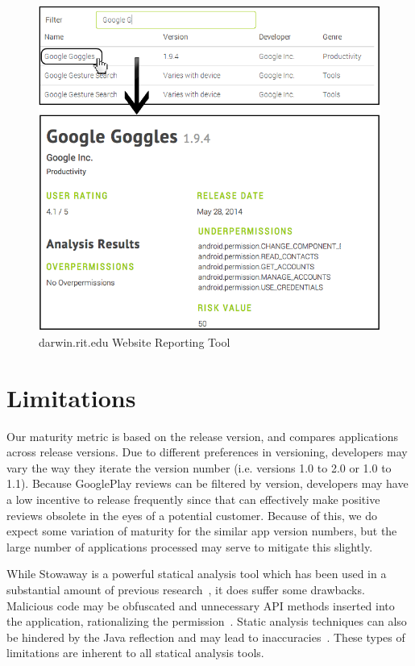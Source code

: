 \documentclass[conference]{IEEEtran}
\begin{document}
\begin{figure}[ht!]
\centering
\includegraphics[width=\columnwidth, angle = 0]{images/screenshot3.png}
\caption{darwin.rit.edu Website Reporting Tool}
\label{fig:website1}
\end{figure}

\section{Limitations}
\label{sec:limitations}

Our maturity metric is based on the release version, and compares applications across release versions. Due to different preferences in versioning, developers may vary the way they iterate the version number (i.e. versions 1.0 to 2.0 or 1.0 to 1.1). Because GooglePlay reviews can be filtered by version, developers may have a low incentive to release frequently since that can effectively make positive reviews obsolete in the eyes of a potential customer. Because of this, we do expect some variation of maturity for the similar app version numbers, but the large number of applications processed may serve to mitigate this slightly.

While Stowaway is a powerful statical analysis tool which has been used in a substantial amount of previous research~\cite{Pearce:2012:APS:2414456.2414498,Stevens_investigatinguser,jeon2011dr}, it does suffer some drawbacks. Malicious code may be obfuscated and unnecessary API methods inserted into the application, rationalizing the permission~\cite{6698893}. Static analysis techniques can also be hindered by the Java reflection and may lead to inaccuracies~\cite{Sridharan:2006:RCP:1133255.1134027,Tripp:2009:TET:1542476.1542486}. These types of limitations are inherent to all statical analysis tools.
\end{document}
